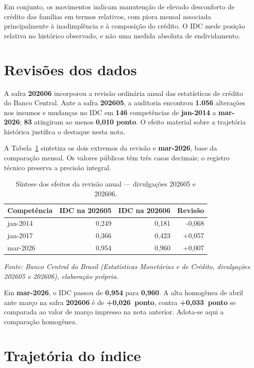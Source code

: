 \documentclass[11pt,a4paper]{article}
\newcommand{\fonte}[1]{%
  \par\vspace{0.2\baselineskip}%
  \small\textit{Fonte: #1}\par\vspace{0.8\baselineskip}%
}
\begin{document}
Em conjunto, os movimentos indicam manutenção de elevado desconforto de crédito das
famílias em termos relativos, com piora mensal associada principalmente à inadimplência
e à composição do crédito. O IDC mede posição relativa no histórico observado, e não
uma medida absoluta de endividamento.

\section{Revisões dos dados}

A safra \textbf{202606} incorporou a revisão ordinária anual das estatísticas
de crédito do Banco Central. Ante a safra \textbf{202605}, a auditoria encontrou
\textbf{1.056} alterações nos insumos e mudanças no IDC em \textbf{146}
competências de \textbf{jan-2014} a \textbf{mar-2026}; \textbf{83} atingiram
ao menos \textbf{0,010 ponto}. O efeito material sobre a trajetória histórica
justifica o destaque nesta nota.

A Tabela~\ref{tab:revisoes-idc} sintetiza os dois extremos da revisão e
\textbf{mar-2026}, base da comparação mensal. Os valores públicos têm três
casas decimais; o registro técnico preserva a precisão integral.

\begin{table}[htbp]
  \centering
  \caption{Síntese dos efeitos da revisão anual --- divulgações 202605 e 202606.}
  \label{tab:revisoes-idc}
  \begin{tabular}{lrrr}
    \toprule
    Competência & IDC na 202605 & IDC na 202606 & Revisão \\
    \midrule
    jan-2014 & 0,249 & 0,181 & -0,068 \\
    jan-2017 & 0,366 & 0,423 & +0,057 \\
    mar-2026 & 0,954 & 0,960 & +0,007 \\
    \bottomrule
  \end{tabular}
  \fonte{Banco Central do Brasil (Estatísticas Monetárias e de Crédito,
  divulgações 202605 e 202606), elaboração própria.}
\end{table}

Em \textbf{mar-2026}, o IDC passou de \textbf{0,954} para \textbf{0,960}.
A alta homogênea de abril ante março na safra \textbf{202606} é de
\textbf{+0,026~ponto}, contra \textbf{+0,033~ponto} se comparada ao valor de
março impresso na nota anterior. Adota-se aqui a comparação homogênea.

\section{Trajetória do índice}
\end{document}
